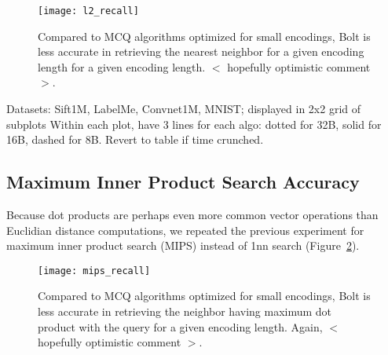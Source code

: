 \begin{figure}[h]
\begin{center}
\label{fig:nn_acc}
\texttt{[image: l2\_recall]}
\caption{Compared to MCQ algorithms optimized for small encodings, Bolt is less accurate in retrieving the nearest neighbor for a given encoding length for a given encoding length. $<$ hopefully optimistic comment $>$.}
\end{center}
\end{figure}

Datasets: Sift1M, LabelMe, Convnet1M, MNIST; displayed in 2x2 grid of subplots
Within each plot, have 3 lines for each algo: dotted for 32B, solid for 16B, dashed for 8B.
Revert to table if time crunched.



\subsection{Maximum Inner Product Search Accuracy}

Because dot products are perhaps even more common vector operations than Euclidian distance computations, we repeated the previous experiment for maximum inner product search (MIPS) instead of 1nn search (Figure~\ref{fig:mips_acc}).

\begin{figure}[h]
\begin{center}
\label{fig:mips_acc}
\texttt{[image: mips\_recall]}
\caption{Compared to MCQ algorithms optimized for small encodings, Bolt is less accurate in retrieving the neighbor having maximum dot product with the query for a given encoding length. Again, $<$ hopefully optimistic comment $>$.}
\end{center}
\end{figure}

